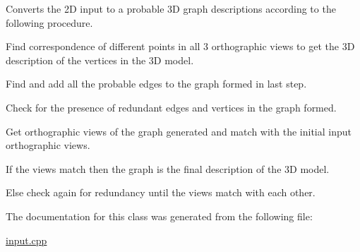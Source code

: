 Converts the 2D input to a probable 3D graph descriptions according to the following procedure.
\begin{DoxyItemize}
\item Find correspondence of different points in all 3 orthographic views to get the 3D description of the vertices in the 3D model.
\item Find and add all the probable edges to the graph formed in last step.
\item Check for the presence of redundant edges and vertices in the graph formed.
\item Get orthographic views of the graph generated and match with the initial input orthographic views.
\item If the views match then the graph is the final description of the 3D model.
\item Else check again for redundancy until the views match with each other.
\end{DoxyItemize}

The documentation for this class was generated from the following file\+:\begin{DoxyCompactItemize}
\item 
\hyperlink{input_8cpp}{input.\+cpp}\end{DoxyCompactItemize}
